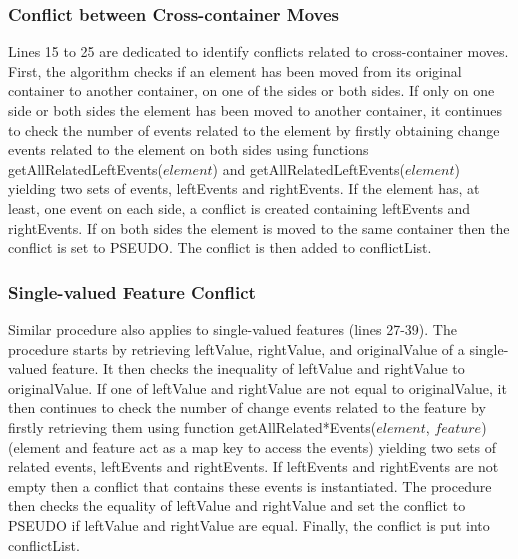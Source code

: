 \subsubsection{Conflict between Cross-container Moves} 
\label{sec:move_conflict} 
Lines 15 to 25 are dedicated to identify conflicts related to cross-container moves. 
First, the algorithm checks if an element has been moved from its original container to another container, on one of the sides or both sides. 
If only on one side or both sides the element has been moved to another container, 
it continues to check the number of events related to the element by firstly obtaining change events related to the element on 
both sides using functions \textsf{getAllRelatedLeftEvents($element$)} and \textsf{getAllRelatedLeftEvents($element$)} yielding two sets of events, 
\textsf{leftEvents} and \textsf{rightEvents}. If the element has, at least, one event on each side,
a conflict is created containing \textsf{leftEvents} and \textsf{rightEvents}. 
If on both sides the element is moved to the same container then the conflict is set to \textsf{PSEUDO}. The conflict is then added to \textsf{conflictList}. 

\subsubsection{Single-valued Feature Conflict} 
\label{sec:single_valued_conflict}
Similar procedure also applies to single-valued features (lines 27-39). The procedure starts by retrieving \textsf{leftValue}, \textsf{rightValue}, and \textsf{originalValue} of a single-valued feature. It then checks the inequality of \textsf{leftValue} and \textsf{rightValue} to \textsf{originalValue}. If one of \textsf{leftValue} and \textsf{rightValue} are not equal to \textsf{originalValue}, it then continues to check the number of change events related to the feature by firstly retrieving them using function \textsf{getAllRelated*Events($element$, $feature$)} (element and feature act as a map key to access the events) yielding two sets of related events, \textsf{leftEvents} and \textsf{rightEvents}. If \textsf{leftEvents} and \textsf{rightEvents} are not empty then a conflict that contains these events is instantiated. The procedure then checks the equality of \textsf{leftValue} and \textsf{rightValue} and set the conflict to \textsf{PSEUDO} if \textsf{leftValue} and \textsf{rightValue} are equal. Finally, the conflict is put into \textsf{conflictList}. 

